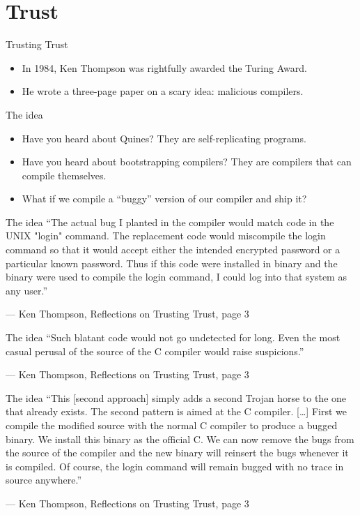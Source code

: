 \documentclass[aspectratio=169]{beamer}
\begin{document}
  \section{Trust}
  \begin{frame}{Trusting Trust}
    \begin{itemize}
      \item In 1984, Ken Thompson was rightfully awarded the Turing Award.
      \item He wrote a three-page paper on a scary idea: malicious compilers.
    \end{itemize}
  \end{frame}
  \begin{frame}{The idea}
    \begin{itemize}
      \item Have you heard about Quines? They are self-replicating programs.
      \item Have you heard about bootstrapping compilers? They are compilers
            that can compile themselves.
      \item What if we compile a “buggy” version of our compiler and ship it?
    \end{itemize}
  \end{frame}
  \begin{frame}{The idea}
    “The actual bug I planted in the compiler would match code in the UNIX
     "login" command.  The replacement code would miscompile the login
     command so that it would accept either the intended encrypted password
     or a particular known password. Thus if this code were installed in
     binary and the binary were used to compile the login command, I could
     log into that system as any user.”

     \indent — Ken Thompson, Reflections on Trusting Trust, page 3
  \end{frame}
  \begin{frame}{The idea}
    “Such blatant code would not go undetected for long. Even the most casual
     perusal of the source of the C compiler would raise suspicions.” 

     \indent — Ken Thompson, Reflections on Trusting Trust, page 3
  \end{frame}
  \begin{frame}{The idea}
    “This [second approach] simply adds a second Trojan horse to the one that
     already exists. The second pattern is aimed at the C compiler. [\ldots] First
     we compile the modified source with the normal C compiler to produce a
     bugged binary. We install this binary as the official C. We can now remove
     the bugs from the source of the compiler and the new binary will reinsert
     the bugs whenever it is compiled. Of course, the login command will remain
     bugged with no trace in source anywhere.”

     \indent — Ken Thompson, Reflections on Trusting Trust, page 3
  \end{frame}
\end{document}
